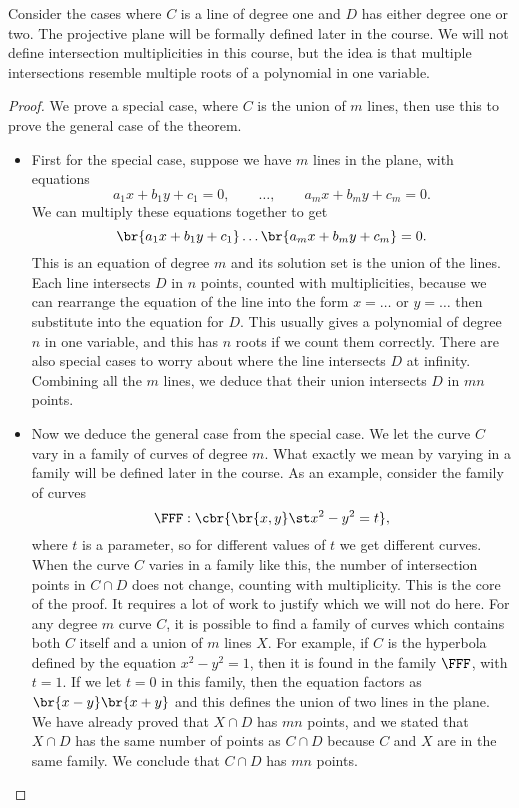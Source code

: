 Consider the cases where $ C $ is a line of degree one and $ D $ has either degree one or two. The projective plane will be formally defined later in the course. We will not define intersection multiplicities in this course, but the idea is that multiple intersections resemble multiple roots of a polynomial in one variable.

\begin{proof}
We prove a special case, where $ C $ is the union of $ m $ lines, then use this to prove the general case of the theorem.
\begin{itemize}
\item First for the special case, suppose we have $ m $ lines in the plane, with equations
$$ a_1x + b_1y + c_1 = 0, \qquad \dots, \qquad a_mx + b_my + c_m = 0. $$
We can multiply these equations together to get
$$ \br{a_1x + b_1y + c_1} \dots \br{a_mx + b_my + c_m} = 0. $$
This is an equation of degree $ m $ and its solution set is the union of the lines. Each line intersects $ D $ in $ n $ points, counted with multiplicities, because we can rearrange the equation of the line into the form $ x = \dots $ or $ y = \dots $ then substitute into the equation for $ D $. This usually gives a polynomial of degree $ n $ in one variable, and this has $ n $ roots if we count them correctly. There are also special cases to worry about where the line intersects $ D $ at infinity. Combining all the $ m $ lines, we deduce that their union intersects $ D $ in $ mn $ points.
\item Now we deduce the general case from the special case. We let the curve $ C $ vary in a family of curves of degree $ m $. What exactly we mean by varying in a family will be defined later in the course. As an example, consider the family of curves
$$ \FFF : \cbr{\br{x, y} \st x^2 - y^2 = t}, $$
where $ t $ is a parameter, so for different values of $ t $ we get different curves. When the curve $ C $ varies in a family like this, the number of intersection points in $ C \cap D $ does not change, counting with multiplicity. This is the core of the proof. It requires a lot of work to justify which we will not do here. For any degree $ m $ curve $ C $, it is possible to find a family of curves which contains both $ C $ itself and a union of $ m $ lines $ X $. For example, if $ C $ is the hyperbola defined by the equation $ x^2 - y^2 = 1 $, then it is found in the family $ \FFF $, with $ t = 1 $. If we let $ t = 0 $ in this family, then the equation factors as $ \br{x - y}\br{x + y} $ and this defines the union of two lines in the plane. We have already proved that $ X \cap D $ has $ mn $ points, and we stated that $ X \cap D $ has the same number of points as $ C \cap D $ because $ C $ and $ X $ are in the same family. We conclude that $ C \cap D $ has $ mn $ points.
\end{itemize}
\end{proof}


